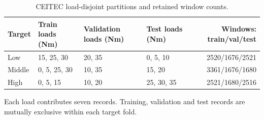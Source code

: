 \begin{table}[htbp]
\caption{CEITEC load-disjoint partitions and retained window counts.}\label{tab:splits}
\footnotesize
\setlength{\tabcolsep}{3pt}
\begin{tabularx}{\textwidth}{lXXXr}
\toprule
Target & Train loads (Nm) & Validation loads (Nm) & Test loads (Nm) & Windows: train/val/test \\
\midrule
Low & 15, 25, 30 & 20, 35 & 0, 5, 10 & 2520/1676/2521 \\
Middle & 0, 5, 25, 30 & 10, 35 & 15, 20 & 3361/1676/1680 \\
High & 0, 5, 15 & 10, 20 & 25, 30, 35 & 2521/1680/2516 \\
\bottomrule
\end{tabularx}
\vspace{2pt}\par\footnotesize Each load contributes seven records. Training, validation and test records are mutually exclusive within each target fold.
\end{table}
